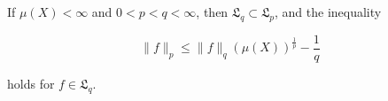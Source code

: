 If $\mu(X) < \infty$ and $0 < p < q < \infty$, then $\mathfrak{L}_q \subset \mathfrak{L}_p$, and the inequality

$$\|f\|_p \leq \|f\|_q (\mu(X))^{\frac{1}{p}} - \frac{1}{q}$$

holds for $f \in \mathfrak{L}_q$.